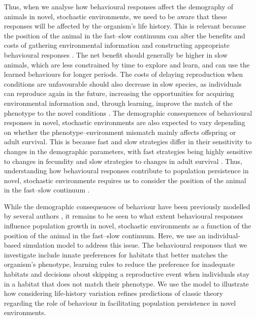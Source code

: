 Thus, when we analyse how behavioural responses affect
the demography of animals in novel, stochastic environments,
we need to be aware that these responses will be affected by the
organism’s life history. This is relevant because the position of
the animal in the fast–slow continuum can alter the benefits
and costs of gathering environmental information and constructing
appropriate behavioural responses \cite{Forcada2008, Saether2000,
Lewontin1969, Saether2005a, Starrfelt2012}. The net
benefit should generally be higher in slow animals, which are
less constrained by time to explore and learn, and can use the
learned behaviours for longer periods. The costs of delaying
reproduction when conditions are unfavourable should also
decrease in slow species, as individuals can reproduce again
in the future, increasing the opportunities for acquiring
environmental information and, through learning, improve
the match of the phenotype to the novel conditions \cite{Sol2012a}.
The demographic consequences of behavioural responses in
novel, stochastic environments are also expected to vary
depending on whether the phenotype–environment mismatch
mainly affects offspring or adult survival. This is because fast
and slow strategies differ in their sensitivity to changes in the
demographic parameters, with fast strategies being highly
sensitive to changes in fecundity and slow strategies to changes
in adult survival \cite{Gaillard2000a}. Thus, understanding how behavioural
responses contribute to population persistence in novel, stochastic
environments requires us to consider the position of
the animal in the fast–slow continuum \citep{Sol2016}.

While the demographic consequences of behaviour have
been previously modelled by several authors \citep{Kokko2001, Cressman2013, Kisdi2002,
kawecki1995demography, Strasser2012}, it
remains to be seen to what extent behavioural responses influence
population growth in novel, stochastic environments as a
function of the position of the animal in the fast–slow continuum.
Here, we use an individual-based simulation model
to address this issue. The behavioural responses that we investigate
include innate preferences for habitats that better
matches the organism’s phenotype, learning rules to reduce
the preference for inadequate habitats and decisions about
skipping a reproductive event when individuals stay in a habitat
that does not match their phenotype. We use the model to
illustrate how considering life-history variation refines predictions
of classic theory regarding the role of behaviour in
facilitating population persistence in novel environments.


